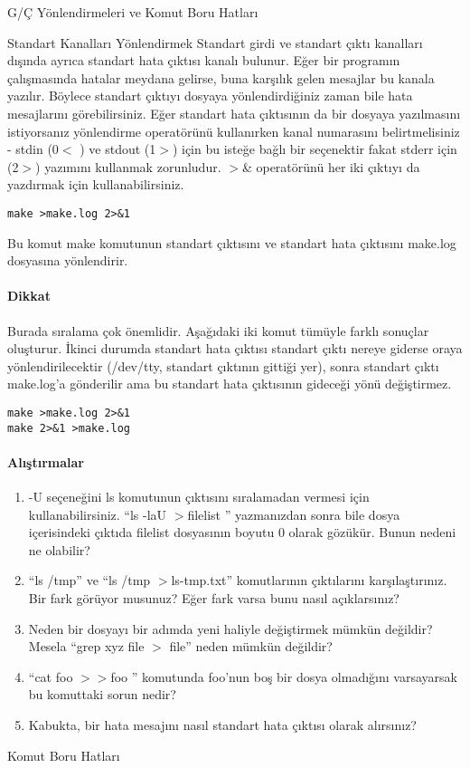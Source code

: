 \begin{section}{G/Ç Yönlendirmeleri ve Komut Boru Hatları}
\begin{subsection}{Standart Kanalları Yönlendirmek}
Standart girdi ve standart çıktı kanalları dışında ayrıca standart hata çıktısı kanalı bulunur. Eğer bir programın çalışmasında hatalar meydana gelirse, buna karşılık gelen mesajlar bu kanala yazılır. Böylece standart çıktıyı dosyaya yönlendirdiğiniz zaman bile hata mesajlarını görebilirsiniz. Eğer standart hata çıktısının da bir dosyaya yazılmasını istiyorsanız yönlendirme operatörünü kullanırken kanal numarasını belirtmelisiniz - stdin (0$<$ ) ve stdout (1$>$) için bu isteğe bağlı bir seçenektir fakat stderr için (2$>$) yazımını kullanmak zorunludur. $>$\& operatörünü her iki çıktıyı da yazdırmak için kullanabilirsiniz.

\footnotesize
\begin{verbatim}
make >make.log 2>&1
\end{verbatim}
\normalsize

Bu komut make komutunun standart çıktısını ve standart hata çıktısını make.log dosyasına yönlendirir.

\paragraph{Dikkat}{Burada sıralama çok önemlidir. Aşağıdaki iki komut tümüyle farklı sonuçlar oluşturur. İkinci durumda standart hata çıktısı standart çıktı nereye giderse oraya yönlendirilecektir (/dev/tty, standart çıktının gittiği yer), sonra standart çıktı make.log'a gönderilir ama bu standart hata çıktısının gideceği yönü değiştirmez.}

\footnotesize
\begin{verbatim}
make >make.log 2>&1 
make 2>&1 >make.log 
\end{verbatim}
\normalsize

\paragraph{{\Huge{\PencilLeftDown}}Alıştırmalar}{
\begin{enumerate}
 \item -U seçeneğini ls komutunun çıktısını sıralamadan vermesi için kullanabilirsiniz. “ls -laU $>$filelist ” yazmanızdan sonra bile dosya içerisindeki çıktıda filelist dosyasının boyutu 0 olarak gözükür. Bunun nedeni ne olabilir?
 \item “ls /tmp” ve “ls /tmp $>$ls-tmp.txt” komutlarının çıktılarını karşılaştırınız. Bir fark görüyor musunuz? Eğer fark varsa bunu nasıl açıklarsınız?
 \item Neden bir dosyayı bir adımda yeni haliyle değiştirmek mümkün değildir? Mesela “grep xyz file $>$ file” neden mümkün değildir?
\item “cat foo $>>$foo ” komutunda foo'nun boş bir dosya olmadığını varsayarsak bu komuttaki sorun nedir?
\item Kabukta, bir hata mesajını nasıl standart hata çıktısı olarak alırsınız?
\end{enumerate}}
\end{subsection}
\begin{subsection}{Komut Boru Hatları}


\end{subsection}
\end{section}
